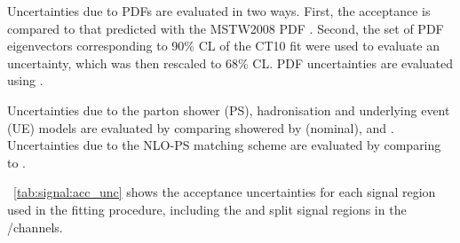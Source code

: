 Uncertainties due to PDFs are evaluated in two ways. First, the acceptance is compared to 
that predicted with the MSTW2008 PDF \cite{MSTW}. Second, the set of PDF eigenvectors 
corresponding to 90\% CL of the CT10 fit were used to evaluate an uncertainty, 
which was then rescaled to 68\% CL. PDF uncertainties are evaluated using \mcatnlo.

Uncertainties due to the parton shower (PS), hadronisation and underlying event (UE) 
models are evaluated by comparing \powhegbox showered by  (nominal),  
and \fherwig. Uncertainties due to the NLO-PS matching scheme are evaluated by comparing 
\meps{\powhegbox}{\fherwig} to \meps{\mcatnlo}{\herwigpp}.

\Table~\ref{tab:signal:acc_unc} shows the acceptance uncertainties for each signal region 
used in the fitting procedure, including the \ptsubleadlep and \mll split signal regions 
in the \emch/\mech channels.

